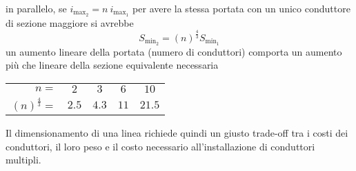 in parallelo, se $i_{\text{max}_2} = n\ i_{\text{max}_1}$ per avere la stessa portata
con un unico conduttore di sezione maggiore si avrebbe
$$
S_{\text{min}_2} = (n)^{\frac{4}{3}} S_\text{min}_1
$$
un aumento lineare della portata (numero di conduttori) comporta un aumento più che lineare 
della sezione equivalente necessaria
\begin{center}
\begin{tabular}{r c c c c}\centering
$n =$ & $2$ & $3$ & $6$ & $10$\\
$(n)^{\frac{4}{3}} =$ & $2.5$ & $4.3$ & $11$ & $21.5$
\end{tabular}
\end{center}
Il dimensionamento di una linea richiede quindi un giusto trade-off tra i costi dei
conduttori, il loro peso e il costo necessario all'installazione di conduttori multipli.
